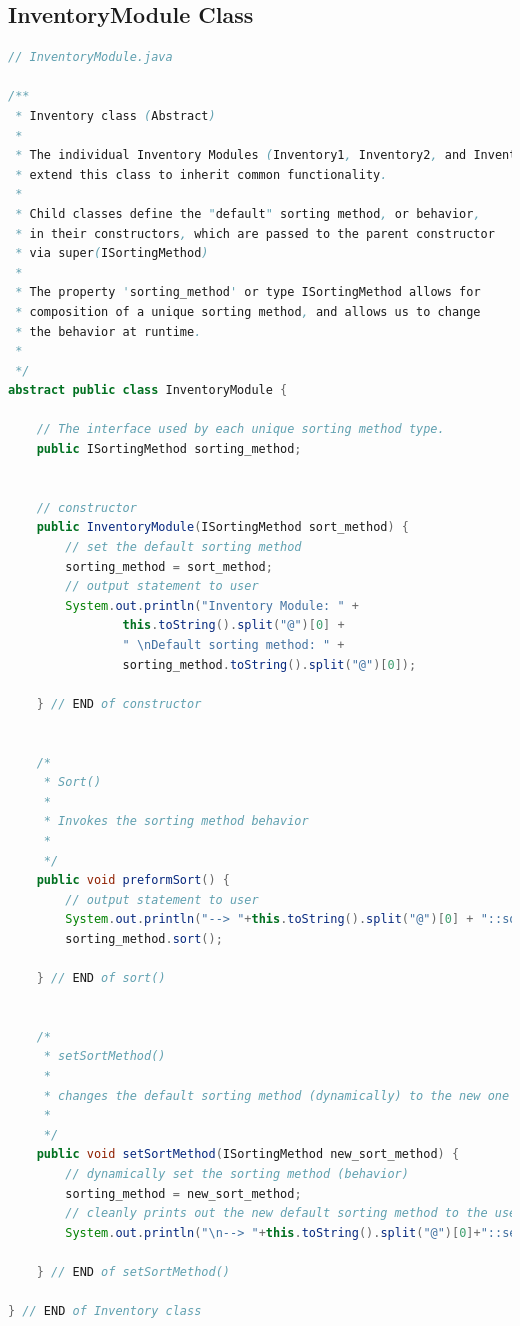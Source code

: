 \documentclass[12pt]{article}
\begin{document}
\subsection*{InventoryModule Class}
\begin{lstlisting}[language=Java]
// InventoryModule.java

/**
 * Inventory class (Abstract)
 * 
 * The individual Inventory Modules (Inventory1, Inventory2, and Inventory3)
 * extend this class to inherit common functionality.
 * 
 * Child classes define the "default" sorting method, or behavior,
 * in their constructors, which are passed to the parent constructor
 * via super(ISortingMethod)
 * 
 * The property 'sorting_method' or type ISortingMethod allows for
 * composition of a unique sorting method, and allows us to change
 * the behavior at runtime.
 *
 */
abstract public class InventoryModule {

    // The interface used by each unique sorting method type.
    public ISortingMethod sorting_method;
    
    
    // constructor
    public InventoryModule(ISortingMethod sort_method) {
        // set the default sorting method
        sorting_method = sort_method;
        // output statement to user
        System.out.println("Inventory Module: " + 
                this.toString().split("@")[0] +
                " \nDefault sorting method: " +
                sorting_method.toString().split("@")[0]);
    
    } // END of constructor
    
    
    /*
     * Sort()
     * 
     * Invokes the sorting method behavior
     * 
     */
    public void preformSort() {
        // output statement to user
        System.out.println("--> "+this.toString().split("@")[0] + "::sort()\nThe sorting method is: " + sorting_method.toString().split("@")[0]);
        sorting_method.sort();
    
    } // END of sort()

    
    /*
     * setSortMethod()
     * 
     * changes the default sorting method (dynamically) to the new one chosen by the user
     * 
     */
    public void setSortMethod(ISortingMethod new_sort_method) {
        // dynamically set the sorting method (behavior)
        sorting_method = new_sort_method;
        // cleanly prints out the new default sorting method to the user
        System.out.println("\n--> "+this.toString().split("@")[0]+"::setSortMethod(ISortingMethod method)\nDynamically set sorting method to: " + sorting_method.toString().split("@")[0]);
    
    } // END of setSortMethod()

} // END of Inventory class
\end{lstlisting}
\end{document}
